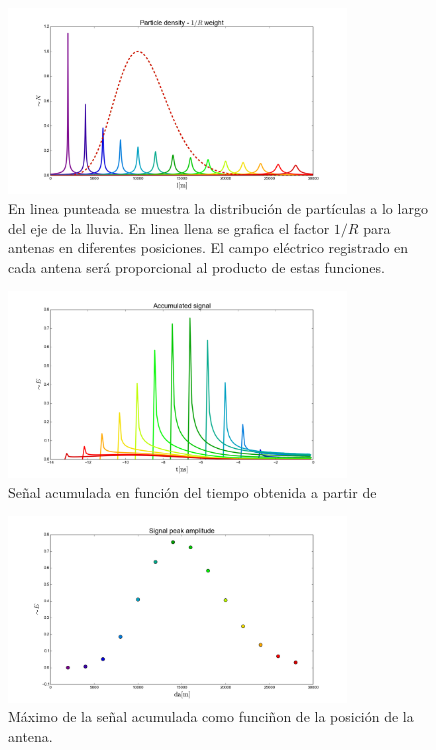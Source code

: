 	\begin{figure}[ht!]
		\centering
		\includegraphics[width=0.8\textwidth]{./fig/EASRadio/timeDelay_pd}
		\caption{\label{fig:timeDelay_pd}
		En linea punteada se muestra la distribuci\'on de part\'iculas a lo largo del eje de la lluvia. En linea llena se grafica el factor $1/R$ para antenas en diferentes posiciones.
		El campo el\'ectrico registrado en cada antena ser\'a proporcional al producto de estas funciones.
		}
	\end{figure}
	
	\begin{figure}[ht!]
		\centering
		\includegraphics[width=0.8\textwidth]{./fig/EASRadio/timeDelay_as}
		\caption{\label{fig:timeDelay_as}
		Se\~nal acumulada en funci\'on del tiempo obtenida a partir de 
		}
	\end{figure}
	
	\begin{figure}[ht!]
		\centering
		\includegraphics[width=0.8\textwidth]{./fig/EASRadio/timeDelay_spa}
		\caption{\label{fig:timeDelay_spa}
		M\'aximo de la se\~nal acumulada como funci\~non de la posici\'on de la antena.
		}
	\end{figure}
	
	